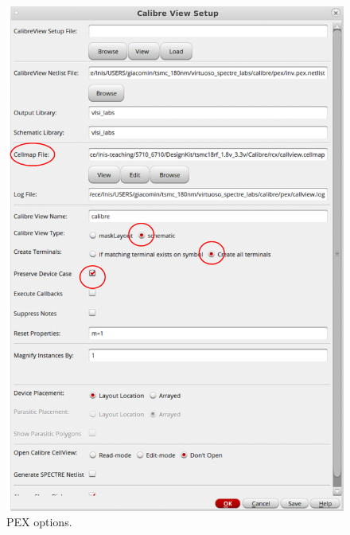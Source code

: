 \begin{figure}
	\vspace{-0mm}
	\centering
	\vspace{1cm}
	\includegraphics[scale=0.32]{figures/lab2_layout/pex_options.pdf}
	\caption{PEX options.}
	\label{fig_pex}
\end{figure}

